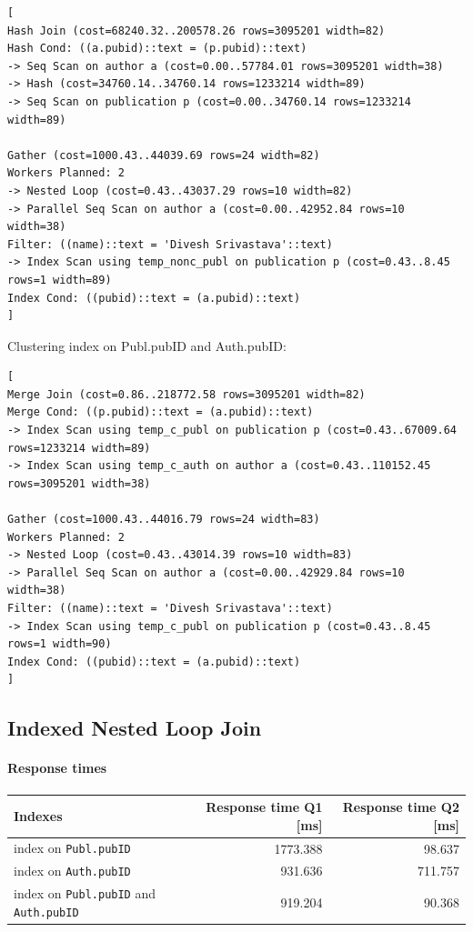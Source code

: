 \documentclass[11pt]{scrartcl}
\begin{document}
{\small
\parskip0pt\begin{verbatim}
[
Hash Join (cost=68240.32..200578.26 rows=3095201 width=82)
Hash Cond: ((a.pubid)::text = (p.pubid)::text)
-> Seq Scan on author a (cost=0.00..57784.01 rows=3095201 width=38)
-> Hash (cost=34760.14..34760.14 rows=1233214 width=89)
-> Seq Scan on publication p (cost=0.00..34760.14 rows=1233214 width=89)

Gather (cost=1000.43..44039.69 rows=24 width=82)
Workers Planned: 2
-> Nested Loop (cost=0.43..43037.29 rows=10 width=82)
-> Parallel Seq Scan on author a (cost=0.00..42952.84 rows=10 width=38)
Filter: ((name)::text = 'Divesh Srivastava'::text)
-> Index Scan using temp_nonc_publ on publication p (cost=0.43..8.45 rows=1 width=89)
Index Cond: ((pubid)::text = (a.pubid)::text)
]
\end{verbatim}}

Clustering index on Publ.pubID and Auth.pubID:

{\small
\parskip0pt\begin{verbatim}
[
Merge Join (cost=0.86..218772.58 rows=3095201 width=82)
Merge Cond: ((p.pubid)::text = (a.pubid)::text)
-> Index Scan using temp_c_publ on publication p (cost=0.43..67009.64 rows=1233214 width=89)
-> Index Scan using temp_c_auth on author a (cost=0.43..110152.45 rows=3095201 width=38)

Gather (cost=1000.43..44016.79 rows=24 width=83)
Workers Planned: 2
-> Nested Loop (cost=0.43..43014.39 rows=10 width=83)
-> Parallel Seq Scan on author a (cost=0.00..42929.84 rows=10 width=38)
Filter: ((name)::text = 'Divesh Srivastava'::text)
-> Index Scan using temp_c_publ on publication p (cost=0.43..8.45 rows=1 width=90)
Index Cond: ((pubid)::text = (a.pubid)::text)
]
\end{verbatim}}

\subsection*{Indexed Nested Loop Join}

\paragraph{Response times}\mbox{}

\begin{table}[H]
  \centering
  \begin{tabular}{l|r|r}
    Indexes & Response time Q1 [ms] & Response time Q2 [ms] \tabularnewline
    \hline
    index on \texttt{Publ.pubID} & 1773.388 & 98.637 \tabularnewline
    index on \texttt{Auth.pubID} & 931.636 & 711.757 \tabularnewline
    index on \texttt{Publ.pubID} and \texttt{Auth.pubID} & 919.204  & 90.368 
        \tabularnewline
  \end{tabular}
\end{table}
\end{document}

